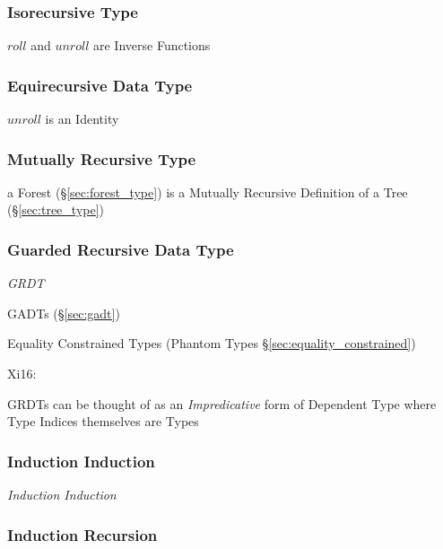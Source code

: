 \subsubsection{Isorecursive Type}\label{sec:isorecursive_type}

$roll$ and $unroll$ are Inverse Functions



\subsubsection{Equirecursive Data Type}\label{sec:equirecursive_type}

$unroll$ is an Identity



\subsubsection{Mutually Recursive Type}
\label{sec:mutually_recursive}\hfill

a Forest (\S\ref{sec:forest_type}) is a Mutually Recursive Definition
of a Tree (\S\ref{sec:tree_type})



\subsubsection{Guarded Recursive Data Type}
\label{sec:grdt}

\emph{GRDT}

\fist GADTs (\S\ref{sec:gadt})

\fist Equality Constrained Types (Phantom Types
\S\ref{sec:equality_constrained})

Xi16:

GRDTs can be thought of as an \emph{Impredicative} form of Dependent
Type where Type Indices themselves are Types



\subsubsection{Induction Induction}\label{sec:induction_induction}

\emph{Induction Induction}



\subsubsection{Induction Recursion}\label{sec:induction_recursion}

